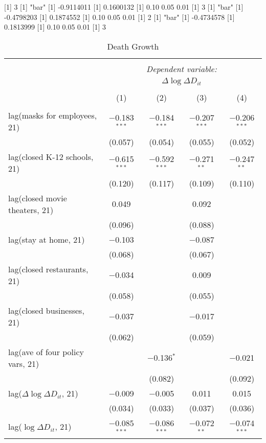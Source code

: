 [1] 3
[1] "bar"
[1] -0.9114011
[1] 0.1600132
[1] 0.10 0.05 0.01
[1] 3
[1] "bar"
[1] -0.4798203
[1] 0.1874552
[1] 0.10 0.05 0.01
[1] 2
[1] "bar"
[1] -0.4734578
[1] 0.1813999
[1] 0.10 0.05 0.01
[1] 3

\begin{table}[!htbp] \centering 
  \caption{Death Growth} 
  \label{} 
\begin{tabular}{@{\extracolsep{1pt}}lcccc} 
\\[-1.8ex]\hline 
\hline \\[-1.8ex] 
 & \multicolumn{4}{c}{\textit{Dependent variable:}} \\ 
\cline{2-5} 
 & \multicolumn{4}{c}{$\Delta \log \Delta D_{it}$} \\ 
\\[-1.8ex] & (1) & (2) & (3) & (4)\\ 
\hline \\[-1.8ex] 
 lag(masks for employees, 21) & $-$0.183$^{***}$ & $-$0.184$^{***}$ & $-$0.207$^{***}$ & $-$0.206$^{***}$ \\ 
  & (0.057) & (0.054) & (0.055) & (0.052) \\ 
  lag(closed K-12 schools, 21) & $-$0.615$^{***}$ & $-$0.592$^{***}$ & $-$0.271$^{**}$ & $-$0.247$^{**}$ \\ 
  & (0.120) & (0.117) & (0.109) & (0.110) \\ 
  lag(closed movie theaters, 21) & 0.049 &  & 0.092 &  \\ 
  & (0.096) &  & (0.088) &  \\ 
  lag(stay at home, 21) & $-$0.103 &  & $-$0.087 &  \\ 
  & (0.068) &  & (0.067) &  \\ 
  lag(closed restaurants, 21) & $-$0.034 &  & 0.009 &  \\ 
  & (0.058) &  & (0.055) &  \\ 
  lag(closed businesses, 21) & $-$0.037 &  & $-$0.017 &  \\ 
  & (0.062) &  & (0.059) &  \\ 
  lag(ave of four policy vars, 21) &  & $-$0.136$^{*}$ &  & $-$0.021 \\ 
  &  & (0.082) &  & (0.092) \\ 
  lag($\Delta \log \Delta D_{it}$, 21) & $-$0.009 & $-$0.005 & 0.011 & 0.015 \\ 
  & (0.034) & (0.033) & (0.037) & (0.036) \\ 
  lag($\log \Delta D_{it}$, 21) & $-$0.085$^{***}$ & $-$0.086$^{***}$ & $-$0.072$^{**}$ & $-$0.074$^{***}$ \\ 

\end{tabular}
\end{table}
